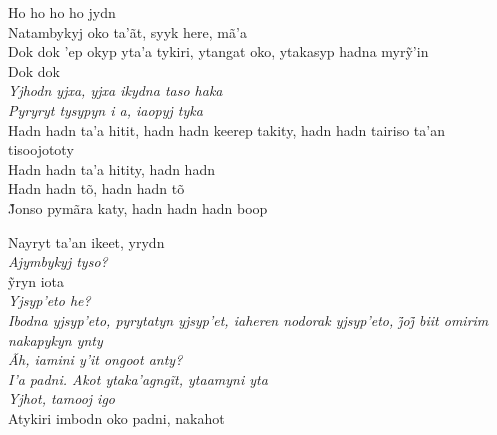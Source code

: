 \noindent   Ho ho ho ho jydn\\
  Natambykyj oko ta'ãt, syyk here, mã'a\\
  Dok dok ’ep okyp yta’a tykiri, ytangat oko, ytakasyp hadna myrỹ’in\\
  Dok dok\\
  \textit{Yjhodn yjxa, yjxa ikydna taso haka}\\
  \textit{Pyryryt tysypyn i a, iaopyj tyka}\\
  Hadn hadn ta'a hitit, hadn hadn keerep takity, hadn hadn tairiso ta'an tisoojototy\\
  Hadn hadn ta'a hitity, hadn hadn\\
  Hadn hadn tõ, hadn hadn tõ\\
  J̃onso pymãra katy, hadn hadn hadn boop

\smallskip
 \begin{center}\end{center}
 \smallskip

\noindent   Nayryt ta'an ikeet, yrydn\\
  \textit{Ajymbykyj tyso?}\\
  ỹryn iota\\
  \textit{Yjsyp'eto he?}\\
  \textit{Ibodna yjsyp’eto, pyrytatyn yjsyp’et, iaheren nodorak yjsyp’eto, j̃oj̃ biit omirim nakapykyn ynty}\\
  \textit{Ãh, iamini y'it ongoot anty?}\\
  \textit{I’a padni. Akot ytaka’agngĩt, ytaamyni yta}\\
  \textit{Yjhot, tamooj igo}\\
  Atykiri imbodn oko padni, nakahot

